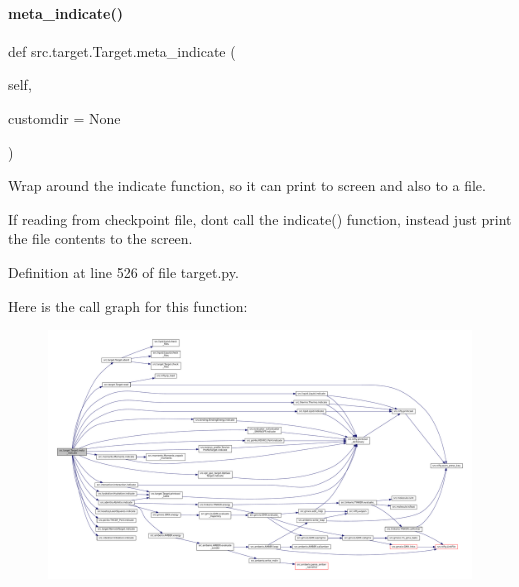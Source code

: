 \paragraph{\texorpdfstring{meta\+\_\+indicate()}{meta\_indicate()}}
{\footnotesize\ttfamily def src.\+target.\+Target.\+meta\+\_\+indicate (\begin{DoxyParamCaption}\item[{}]{self,  }\item[{}]{customdir = {\ttfamily None} }\end{DoxyParamCaption})}



Wrap around the indicate function, so it can print to screen and also to a file. 

If reading from checkpoint file, don\textquotesingle{}t call the indicate() function, instead just print the file contents to the screen. 

Definition at line 526 of file target.\+py.

Here is the call graph for this function\+:
\nopagebreak
\begin{figure}[H]
\begin{center}
\leavevmode
\includegraphics[width=350pt]{classsrc_1_1target_1_1Target_a75dc5c4428df625f265e481f61718ec1_cgraph}
\end{center}
\end{figure}
\mbox{\label{classsrc_1_1target_1_1Target_aa6d59de5918c58d75a9f23eb1c5bff39}} 
